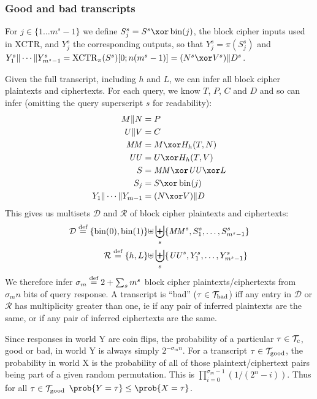 \documentclass[hctr.tex]{subfiles}
\begin{document}
\subsubsection{Good and bad transcripts}
For \(j \in \{1 \ldots m^s-1\}\) we define \(S_j^s = S^s \xor \fromint(j)\),
the block cipher inputs used in XCTR, and \(Y_j^s\) the corresponding
outputs, so that \(Y_j^s = \pi(S_j^s)\) and 
\(Y_1^s \Concat \cdots \Concat Y_{m^s-1}^s = \XCTR_\pi(S^s)[0;n(m^s -1)] 
= (N^s \xor V^s) \Concat D^s\).

Given the full transcript, including \(h\) and \(L\),
we can infer all block cipher plaintexts and ciphertexts.
For each query, we know \(T\), \(P\), \(C\) and \(D\)
and so can infer
(omitting the query superscript \(s\) for readability):
\begin{align*}
    M \Concat N &= P \\
    U \Concat V &= C \\
    \MM &= M \xor H_h(T, N)\\
    \UU &= U \xor H_h(T, V)\\
    S &= \MM \xor \UU \xor L\\ 
    S_j &= S \xor \fromint(j)\\
    Y_1 \Concat \cdots \Concat Y_{m-1} &= (N \xor V) \Concat D \\
\end{align*}
This gives us multisets \(\mathcal{D}\) and \(\mathcal{R}\)
of block cipher plaintexts and ciphertexts:
\begin{align*}
    \mathcal{D} \stackrel{\text{def}}{=} \{\operatorname{bin}(0), \operatorname{bin}(1)\} \uplus &
    \biguplus_s \{\mathit{MM}^s, S_1^s, \ldots, S_{m^s-1}^s\}\\
    \mathcal{R} \stackrel{\text{def}}{=} \{h, L\} \uplus &
    \biguplus_s \{\mathit{UU}^s, Y_1^s, \ldots, Y_{m^s-1}^s\}
\end{align*}
We therefore infer \(\sigma_m \stackrel{\text{def}}{=} 2 + \sum_s m^s\) block cipher
plaintexts/ciphertexts from \(\sigma_m n\) bits of query response.
A transcript is ``bad'' (\(\tau \in \mathcal{T}_\mathrm{bad}\))
iff any entry in \(\mathcal{D}\) or \(\mathcal{R}\)
has multiplicity greater than one,
ie if any pair of inferred plaintexts are the same, or
if any pair of inferred ciphertexts are the same.

Since responses in world Y are coin flips,
the probability of a 
particular \(\tau \in \mathcal{T}_\mathrm{c}\), good or bad,
in world Y is always simply \(2^{-\sigma_m n}\).
For a transcript \(\tau \in \mathcal{T}_\mathrm{good}\),
the probability in world X
is the probability of all of those plaintext/ciphertext
pairs being part of a given random permutation.
This is 
\(\prod_{i=0}^{\sigma_m -1}(1/(2^n - i))\).
Thus for all \(\tau \in \mathcal{T}_\mathrm{good}\)
\(\prob{Y = \tau} \leq \prob{X = \tau}\). 
\end{document}

